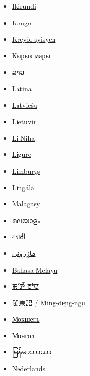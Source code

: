 \documentclass[11pt,a4paper]{article}
\begin{document}
\begin{itemize}
\item \href{https://rn.wikipedia.org/wiki/Imbata}{Ikirundi}
\item \href{https://kg.wikipedia.org/wiki/Kivadangu}{Kongo}
\item \href{https://ht.wikipedia.org/wiki/Kanna}{Kreyòl ayisyen}
\item \href{https://mrj.wikipedia.org/wiki/\%D0\%9B\%D1\%8B\%D0\%B4\%D1\%8B\%D0\%B2\%D0\%BB\%D3\%93}{Кырык мары}
\item \href{https://lo.wikipedia.org/wiki/\%E0\%BB\%80\%E0\%BA\%9B\%E0\%BA\%B1\%E0\%BA\%94}{ລາວ}
\item \href{https://la.wikipedia.org/wiki/Anas\_\%28avis\%29}{Latina}
\item \href{https://lv.wikipedia.org/wiki/P\%C4\%ABle}{Latviešu}
\item \href{https://lt.wikipedia.org/wiki/Antis}{Lietuvių}
\item \href{https://nia.wikipedia.org/wiki/Bebe}{Li Niha}
\item \href{https://lij.wikipedia.org/wiki/Annia}{Ligure}
\item \href{https://li.wikipedia.org/wiki/Aenj}{Limburgs}
\item \href{https://ln.wikipedia.org/wiki/Libat\%C3\%A1}{Lingála}
\item \href{https://mg.wikipedia.org/wiki/Ganagana}{Malagasy}
\item \href{https://ml.wikipedia.org/wiki/\%E0\%B4\%A4\%E0\%B4\%BE\%E0\%B4\%B1\%E0\%B4\%BE\%E0\%B4\%B5\%E0\%B5\%8D}{മലയാളം}
\item \href{https://mr.wikipedia.org/wiki/\%E0\%A4\%AC\%E0\%A4\%A6\%E0\%A4\%95}{मराठी}
\item \href{https://mzn.wikipedia.org/wiki/\%D8\%B3\%DB\%8C\%DA\%A9\%D8\%A7}{مازِرونی}
\item \href{https://ms.wikipedia.org/wiki/Itik}{Bahasa Melayu}
\item \href{https://mni.wikipedia.org/wiki/\%EA\%AF\%89\%EA\%AF\%A5\%EA\%AF\%85\%EA\%AF\%A8}{ꯃꯤꯇꯩ ꯂꯣꯟ}
\item \href{https://cdo.wikipedia.org/wiki/\%C3\%81k}{閩東語 / Mìng-dĕ̤ng-ngṳ̄}
\item \href{https://mdf.wikipedia.org/wiki/\%D0\%AF\%D0\%BA\%D1\%81\%D1\%8F\%D1\%80\%D0\%B3\%D0\%B0}{Мокшень}
\item \href{https://mn.wikipedia.org/wiki/\%D0\%9D\%D1\%83\%D0\%B3\%D0\%B0\%D1\%81}{Монгол}
\item \href{https://my.wikipedia.org/wiki/\%E1\%80\%98\%E1\%80\%B2}{မြန်မာဘာသာ}
\item \href{https://nl.wikipedia.org/wiki/Eenden}{Nederlands}

\end{itemize}
\end{document}
